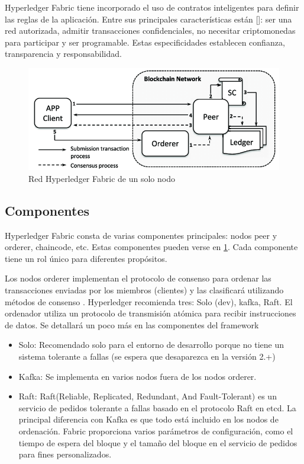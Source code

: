 Hyperledger Fabric tiene incorporado el uso de contratos inteligentes para definir las reglas de la aplicación. Entre sus principales características están [\cite{ullah2021blockchain}]: ser una red autorizada, admitir transacciones confidenciales, no necesitar criptomonedas para participar y ser programable. Estas especificidades establecen confianza, transparencia y responsabilidad.

\begin{figure}[h!]
	\centering
	\includegraphics[width=\linewidth]{Graphics/single_node_network.png}
	\caption{Red Hyperledger Fabric de un solo nodo}
	\label{fig:2}
\end{figure}


\subsection{Componentes}

Hyperledger Fabric consta de varias componentes principales: nodos peer y orderer, chaincode, etc. Estas componentes pueden verse en \ref{fig:2}. Cada componente tiene un rol único para diferentes propósitos.

Los nodos orderer implementan el protocolo de consenso para ordenar las transacciones enviadas por los miembros (clientes) y las clasificará utilizando métodos de consenso . Hyperledger recomienda tres: Solo (dev), kafka, Raft. El ordenador utiliza un protocolo de transmisión atómica para recibir instrucciones de datos. Se detallará un poco más en las componentes del framework

\begin{itemize}
	\item Solo: Recomendado solo para el entorno de desarrollo porque no tiene un sistema tolerante a fallas (se espera que desaparezca en la versión 2.+)
	\item Kafka: Se implementa en varios nodos fuera de los nodos orderer.
	\item Raft: Raft(Reliable, Replicated, Redundant, And Fault-Tolerant) es un servicio de pedidos tolerante a fallas basado en el protocolo Raft en etcd. La principal diferencia con Kafka es que todo está incluido en los nodos de ordenación. Fabric proporciona varios parámetros de configuración, como el tiempo de espera del bloque y el tamaño del bloque en el servicio de pedidos para fines personalizados. 
\end{itemize}

